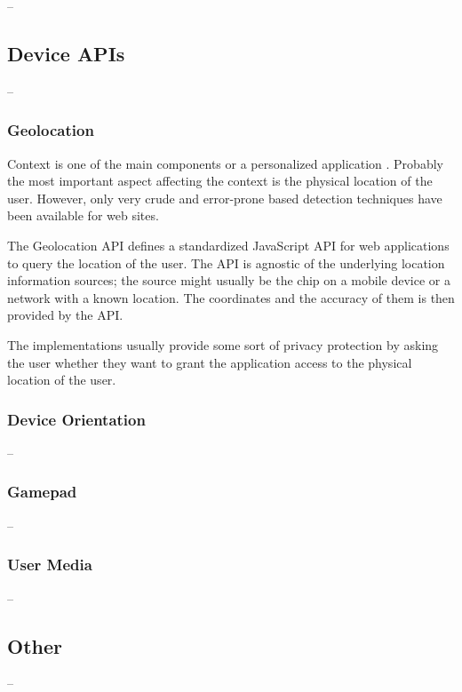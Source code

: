 --

\subsection{Device APIs}

--

\subsubsection{Geolocation}

Context is one of the main components or a personalized application
\cite{fling2009mobile}. Probably the most important aspect affecting
the context is the physical location of the user. However, only very
crude and error-prone  based detection techniques have been
available for web sites.

The Geolocation API defines a standardized JavaScript API for web
applications to query the location of the user. The API is agnostic of
the underlying location information sources; the source might usually
be the  chip on a mobile device or a  network
with a known location. The coordinates and the accuracy of them is
then provided by the API. \cite{geolocationAPI}

The implementations usually provide some sort of privacy protection by
asking the user whether they want to grant the application access to
the physical location of the user.

\subsubsection{Device Orientation}

--

\subsubsection{Gamepad}

--

\subsubsection{User Media}

--

\subsection{Other}

--


